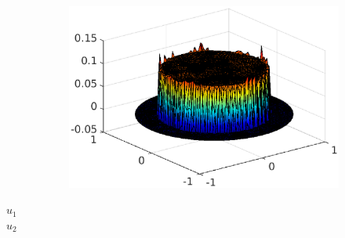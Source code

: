 \documentclass[aspectratio=169]{beamer}
\begin{document}
\begin{frame}
\begin{figure}[t]
\begin{subfigure}[normal]{0.44\textwidth}
\label{ref:position_membrane_convergence}
\end{subfigure}
\qquad
\begin{subfigure}[normal]{0.44\textwidth}
\includegraphics[width=\textwidth]{fig_article_chap_1/fig_lambda_cv.eps}     
\label{ref:lambda_membrane_convergence} 
\end{subfigure}
\end{figure}
\vspace*{-4.4cm}\hspace*{1.5 cm}$u_1$\\
\vspace*{0.7cm}\hspace*{1.5 cm}$u_2$
\end{frame}
%
\end{document}
